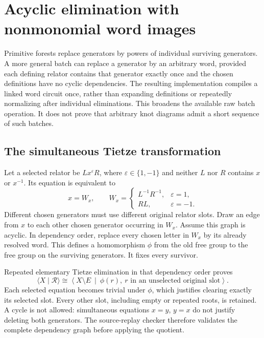 \section{Acyclic elimination with nonmonomial word images}
\label{sec:elimination-batch}

Primitive forests replace generators by powers of individual surviving
generators. A more general batch can replace a generator by an arbitrary
word, provided each defining relator contains that generator exactly once
and the chosen definitions have no cyclic dependencies. The resulting
implementation compiles a linked word circuit once, rather than expanding
definitions or repeatedly normalizing after individual eliminations.
This broadens the available raw batch operation. It does not prove that
arbitrary knot diagrams admit a short sequence of such batches.

\subsection{The simultaneous Tietze transformation}

Let a selected relator be $Lx^\varepsilon R$, where $\varepsilon\in\{1,-1\}$
and neither $L$ nor $R$ contains $x$ or $x^{-1}$. Its equation is equivalent to
\[
 x=W_x,\qquad W_x=
 \begin{cases}
 L^{-1}R^{-1},&\varepsilon=1,\\
 RL,&\varepsilon=-1.
 \end{cases}
\]
Different chosen generators must use different original relator slots.
Draw an edge from $x$ to each other chosen generator occurring in $W_x$.
Assume this graph is acyclic. In dependency order, replace every chosen
letter in $W_x$ by its already resolved word. This defines a homomorphism
$\phi$ from the old free group to the free group on the surviving generators.
It fixes every survivor.

Repeated elementary Tietze elimination in that dependency order proves
\[
 \langle X\mid\mathcal R\rangle\cong
 \left\langle X\setminus E\ \middle|\
 \phi(r),\ r\text{ in an unselected original slot}\right\rangle.
\]
Each selected equation becomes trivial under $\phi$, which justifies
clearing exactly its selected slot. Every other slot, including empty or
repeated roots, is retained. A cycle is not allowed: simultaneous equations
$x=y$, $y=x$ do not justify deleting both generators. The source-replay
checker therefore validates the complete dependency graph before applying
the quotient.

